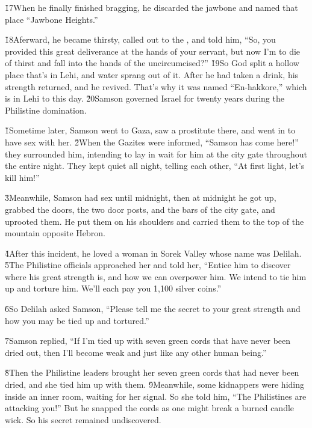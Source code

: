 \v{17}When he finally finished bragging, he discarded the jawbone and named that place ``Jawbone Heights.''

\v{18}Aferward, he became thirsty, called out to the , and told him, ``So, you provided this great deliverance at the hands of your servant, but now I'm to die of thirst and fall into the hands of the uncircumcised?'' \v{19}So God split a hollow place that's in Lehi, and water sprang out of it. After he had taken a drink, his strength returned, and he revived. That's why it was named ``En-hakkore,'' which is in Lehi to this day. \v{20}Samson governed Israel for twenty years during the Philistine domination.

\v{1}Sometime later, Samson went to Gaza, saw a prostitute there, and went in to have sex with her. \v{2}When the Gazites were informed, ``Samson has come here!'' they surrounded him, intending to lay in wait for him at the city gate throughout the entire night. They kept quiet all night, telling each other, ``At first light, let's kill him!''

\v{3}Meanwhile, Samson had sex until midnight, then at midnight he got up, grabbed the doors, the two door posts, and the bars of the city gate, and uprooted them. He put them on his shoulders and carried them to the top of the mountain opposite Hebron.

\v{4}After this incident, he loved a woman in Sorek Valley whose name was Delilah. \v{5}The Philistine officials approached her and told her, ``Entice him to discover where his great strength is, and how we can overpower him. We intend to tie him up and torture him. We'll each pay you 1,100 silver coins.''

\v{6}So Delilah asked Samson, ``Please tell me the secret to your great strength and how you may be tied up and tortured.''

\v{7}Samson replied, ``If I'm tied up with seven green cords that have never been dried out, then I'll become weak and just like any other human being.''

\v{8}Then the Philistine leaders brought her seven green cords that had never been dried, and she tied him up with them. \v{9}Meanwhile, some kidnappers were hiding inside an inner room, waiting for her signal. So she told him, ``The Philistines are attacking you!'' But he snapped the cords as one might break a burned candle wick. So his secret remained undiscovered.


